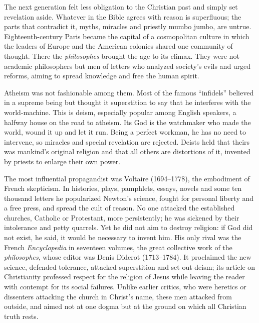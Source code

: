 The next generation felt less obligation to the Christian past and simply set revelation aside. Whatever in the Bible agrees with reason is superfluous; the parts that contradict it, myths,
miracles and priestly mumbo jumbo, are untrue. Eighteenth-century Paris became the capital of a
cosmopolitan culture in which the leaders of Europe and the American colonies shared one community of
thought. There the \emph{philosophes} brought the age to its climax. They were not academic
philosophers but men of letters who analyzed society's evils and urged reforms, aiming to spread
knowledge and free the human spirit.

Atheism was not fashionable among them. Most of the famous ``infidels'' believed in a supreme being
but thought it superstition to say that he interferes with the world-machine. This is deism,
especially popular among English speakers, a halfway house on the road to atheism. Its God is the
watchmaker who made the world, wound it up and let it run. Being a perfect workman, he has no need to
intervene, so miracles and special revelation are rejected. Deists held that theirs was mankind's
original religion and that all others are distortions of it, invented by priests to enlarge their
own power.

The most influential propagandist was Voltaire (1694--1778), the embodiment of French skepticism. In
histories, plays, pamphlets, essays, novels and some ten thousand letters he popularized Newton's
science, fought for personal liberty and a free press, and spread the cult of reason. No one attacked the established churches, Catholic or Protestant, more persistently; he was sickened by their intolerance
and petty quarrels. Yet he did not aim to destroy religion: if God did not exist, he said, it would
be necessary to invent him. His only rival was the French \emph{Encyclopedia} in seventeen volumes,
the great collective work of the \emph{philosophes}, whose editor was Denis Diderot (1713--1784). It proclaimed the new science, defended tolerance, attacked superstition and set out deism; its article on
Christianity professed respect for the religion of Jesus while leaving the reader with contempt for
its social failures. Unlike earlier critics, who were heretics or dissenters attacking the church in
Christ's name, these men attacked from outside, and aimed not at one dogma but at the ground on which all Christian truth rests.


